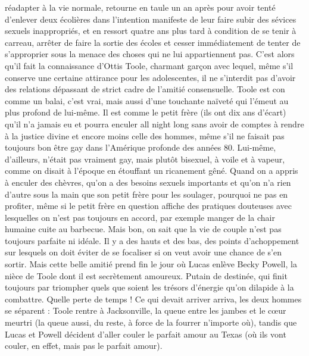 réadapter à la vie normale, retourne en taule un an après pour avoir tenté d’enlever deux écolières dans l’intention manifeste de leur faire subir des sévices sexuels inappropriés, et en ressort quatre ans plus tard à condition de se tenir à carreau, arrêter de faire la sortie des écoles et cesser immédiatement de tenter de s’approprier sous la menace des choses qui ne lui appartiennent pas. C’est alors qu’il fait la connaissance d’Ottis Toole, charmant garçon avec lequel, même s’il conserve une certaine attirance pour les adolescentes, il ne s’interdit pas d’avoir des relations dépassant de strict cadre de l’amitié consensuelle. Toole est con comme un balai, c’est vrai, mais aussi d’une touchante naïveté qui l’émeut au plus profond de lui-même. Il est comme le petit frère (ils ont dix ans d’écart) qu’il n’a jamais eu et pourra enculer all night long sans avoir de comptes à rendre à la justice divine et encore moins celle des hommes, même s’il ne faisait pas toujours bon être gay dans l’Amérique profonde des années 80. Lui-même, d’ailleurs, n’était pas vraiment gay, mais plutôt bisexuel, à voile et à vapeur, comme on disait à l’époque en étouffant un ricanement gêné. Quand on a appris à enculer des chèvres, qu’on a des besoins sexuels importants et qu’on n’a rien d’autre sous la main que son petit frère pour les soulager, pourquoi ne pas en profiter, même si le petit frère en question affiche des pratiques douteuses avec lesquelles on n’est pas toujours en accord, par exemple manger de la chair humaine cuite au barbecue. Mais bon, on sait que la vie de couple n’est pas toujours parfaite ni idéale. Il y a des hauts et des bas, des points d’achoppement sur lesquels on doit éviter de se focaliser si on veut avoir une chance de s’en sortir. Mais cette belle amitié prend fin le jour où Lucas enlève Becky Powell, la nièce de Toole dont il est secrètement amoureux. Putain de destinée, qui finit toujours par triompher quels que soient les trésors d’énergie qu’on dilapide à la combattre. Quelle perte de temps ! Ce qui devait arriver arriva, les deux hommes se séparent : Toole rentre à Jacksonville, la queue entre les jambes et le cœur meurtri (la queue aussi, du reste, à force de la fourrer n’importe où), tandis que Lucas et Powell décident d’aller couler le parfait amour au Texas (où ils vont couler, en effet, mais pas le parfait amour).

